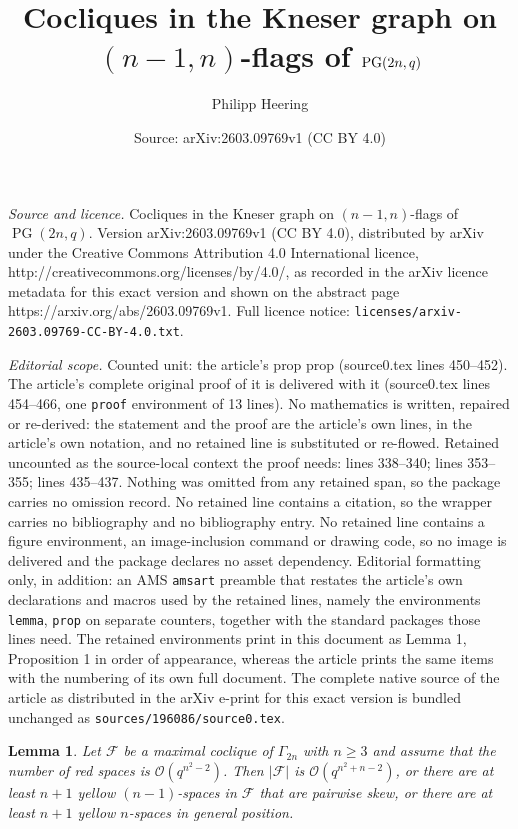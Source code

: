 \documentclass[10pt,a4paper]{amsart}
\title{Cocliques in the Kneser graph on $(n-1,n)$-flags of $\PG(2n,q)$}
\author{Philipp Heering}
\date{Source: arXiv:2603.09769v1 (CC BY 4.0)}
\newtheorem{lemma}{Lemma}
\newcommand{\EKR}{\mathcal{F}}
\newcommand{\OO}{\mathcal{O}}
\DeclareMathOperator{\PG}{PG}
\begin{document}
\maketitle

\noindent\emph{Source and licence.} Cocliques in the Kneser graph on $(n-1,n)$-flags of $\PG(2n,q)$. Version arXiv:2603.09769v1 (CC BY 4.0), distributed by arXiv under the Creative Commons Attribution 4.0 International licence, http://creativecommons.org/licenses/by/4.0/, as recorded in the arXiv licence metadata for this exact version and shown on the abstract page https://arxiv.org/abs/2603.09769v1. Full licence notice: \texttt{licenses/arxiv-2603.09769-CC-BY-4.0.txt}.\par\smallskip

\noindent\textit{Editorial scope.} Counted unit: the article's prop prop (source0.tex lines 450--452). The article's complete original proof of it is delivered with it (source0.tex lines 454--466, one \texttt{proof} environment of 13 lines). No mathematics is written, repaired or re-derived: the statement and the proof are the article's own lines, in the article's own notation, and no retained line is substituted or re-flowed.  Retained uncounted as the source-local context the proof needs: lines 338--340; lines 353--355; lines 435--437.  Nothing was omitted from any retained span, so the package carries no omission record.  No retained line contains a citation, so the wrapper carries no bibliography and no bibliography entry.  No retained line contains a figure environment, an image-inclusion command or drawing code, so no image is delivered and the package declares no asset dependency.  Editorial formatting only, in addition: an AMS \texttt{amsart} preamble that restates the article's own declarations and macros used by the retained lines, namely the environments \texttt{lemma}, \texttt{prop} on separate counters, together with the standard packages those lines need.  The retained environments print in this document as Lemma 1, Proposition 1 in order of appearance, whereas the article prints the same items with the numbering of its own full document.  The complete native source of the article as distributed in the arXiv e-print for this exact version is bundled unchanged as \texttt{sources/196086/source0.tex}.
\begin{lemma} \label{L: many yellow pw skew}
     Let $\EKR$ be a maximal coclique of $\Gamma_{2n}$ with $n\geq 3$ and assume that the number of red spaces is $\OO(q^{n^2-2})$. Then $|\EKR|$ is $\OO(q^{n^2+n-2})$, or there are at least $n+1$ yellow $(n-1)$-spaces in $\EKR$ that are pairwise skew, or there are at least $n+1$ yellow $n$-spaces in general position.
\end{lemma}
\end{document}
